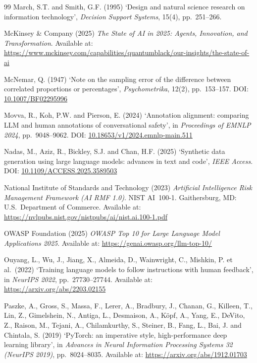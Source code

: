 \documentclass[12pt,a4paper]{article}
\begin{document}
\begin{thebibliography}{99}
March, S.T. and Smith, G.F. (1995)
`Design and natural science research on information technology',
\textit{Decision Support Systems}, 15(4), pp.~251--266.

McKinsey \& Company (2025)
\textit{The State of AI in 2025: Agents, Innovation, and Transformation}.
Available at: \url{https://www.mckinsey.com/capabilities/quantumblack/our-insights/the-state-of-ai}

McNemar, Q. (1947)
`Note on the sampling error of the difference between correlated proportions
or percentages',
\textit{Psychometrika}, 12(2), pp.~153--157.
DOI: \href{https://doi.org/10.1007/BF02295996}{10.1007/BF02295996}

Movva, R., Koh, P.W. and Pierson, E. (2024)
`Annotation alignment: comparing LLM and human annotations of conversational safety',
in \textit{Proceedings of EMNLP 2024}, pp.~9048--9062.
DOI: \href{https://doi.org/10.18653/v1/2024.emnlp-main.511}{10.18653/v1/2024.emnlp-main.511}

Nadas, M., Aziz, R., Bickley, S.J. and Chan, H.F. (2025)
`Synthetic data generation using large language models: advances in text and code',
\textit{IEEE Access}.
DOI: \href{https://doi.org/10.1109/ACCESS.2025.3589503}{10.1109/ACCESS.2025.3589503}

National Institute of Standards and Technology (2023)
\textit{Artificial Intelligence Risk Management Framework (AI RMF 1.0)}.
NIST AI~100-1. Gaithersburg, MD: U.S.\ Department of Commerce.
Available at: \url{https://nvlpubs.nist.gov/nistpubs/ai/nist.ai.100-1.pdf}

OWASP Foundation (2025)
\textit{OWASP Top 10 for Large Language Model Applications 2025}.
Available at: \url{https://genai.owasp.org/llm-top-10/}

Ouyang, L., Wu, J., Jiang, X., Almeida, D., Wainwright, C., Mishkin, P. et al.\ (2022)
`Training language models to follow instructions with human feedback',
in \textit{NeurIPS 2022}, pp.~27730--27744.
Available at: \url{https://arxiv.org/abs/2203.02155}


Paszke, A., Gross, S., Massa, F., Lerer, A., Bradbury, J., Chanan, G.,
Killeen, T., Lin, Z., Gimelshein, N., Antiga, L., Desmaison, A., Köpf, A.,
Yang, E., DeVito, Z., Raison, M., Tejani, A., Chilamkurthy, S., Steiner, B.,
Fang, L., Bai, J. and Chintala, S. (2019)
`PyTorch: an imperative style, high-performance deep learning library',
in \textit{Advances in Neural Information Processing Systems 32 (NeurIPS 2019)},
pp.~8024--8035.
Available at: \url{https://arxiv.org/abs/1912.01703}


\end{thebibliography}
\end{document}
